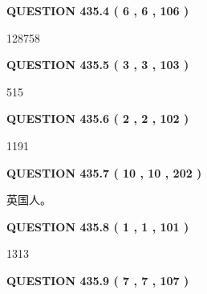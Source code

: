 \documentclass{ctexart}
\begin{document}
{\textbf{\Large{QUESTION
435.4 
 ( 6 , 6 , 106 )
}}}
  
  
 
 
\noindent{}

128758
 
 
  
\vspace{0.2in}
  
{\textbf{\Large{QUESTION
435.5 
 ( 3 , 3 , 103 )
}}}
  
  
 
 
\noindent{}

515
 
 
  
\vspace{0.2in}
  
{\textbf{\Large{QUESTION
435.6 
 ( 2 , 2 , 102 )
}}}
  
  
 
 
\noindent{}

1191
 
 
  
\vspace{0.2in}
  
{\textbf{\Large{QUESTION
435.7 
 ( 10 , 10 , 202 )
}}}
  
  
 
 
\noindent{}
 
 
英国人。
 
 
 
 
  
\vspace{0.2in}
  
{\textbf{\Large{QUESTION
435.8 
 ( 1 , 1 , 101 )
}}}
  
  
 
 
\noindent{}

1313
 
 
  
\vspace{0.2in}
  
{\textbf{\Large{QUESTION
435.9 
 ( 7 , 7 , 107 )
}}}
  
  
 
 
\noindent{}
\end{document}
